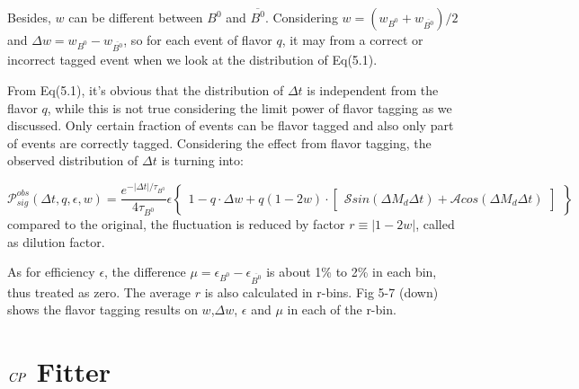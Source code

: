  Besides, $w$ can be different between $B^0$ and $\overline{B^0}$. Considering 
 $w = (w_{B^0}+w_{\overline{B^0}})/2$ and $\Delta w = w_{B^0}-w_{\overline{B^0}} $, so for each event of flavor $q$, it may from a correct or incorrect tagged event when we look at the distribution of Eq(5.1). 
 
 From Eq(5.1), it's obvious that the distribution of $\Delta t$ is independent from the flavor $q$, while this is not true considering the limit power of flavor tagging as we discussed. Only certain fraction of events can be flavor tagged and also only part of events are correctly tagged. Considering the effect from flavor tagging, the observed distribution of $\Delta t$ is turning into:
 
 \begin{equation}
 \mathcal{P}_{sig}^{obs}(\Delta t, q, \epsilon, w) = 
 \frac{e^{-|\Delta t|/\tau_{B^0}}}{4\tau_{B^0}}
 \epsilon
 \begin{Bmatrix}
 1 - q\cdot \Delta w+ q(1-2w)\cdot 
 \begin{bmatrix}
 \mathcal{S}sin(\Delta M_d \Delta t) + 
 \mathcal{A}cos(\Delta M_d \Delta t)
 \end{bmatrix}
 \end{Bmatrix}
 \end{equation} 
 compared to the original, the fluctuation is reduced by factor $r\equiv |1-2w|$, called as dilution factor. 
 
 As for efficiency $\epsilon$, the difference $\mu = \epsilon_{B^0}-\epsilon_{\overline{B^0}} $ is about 1\% to 2\% in each bin, thus treated as zero. The average $r$ is also calculated in r-bins. Fig 5-7 (down) shows the flavor tagging results on $w$,$\Delta w$, $\epsilon$ and $\mu$ in each of the r-bin. 
 




\section{$\it{CP}$ Fitter}

